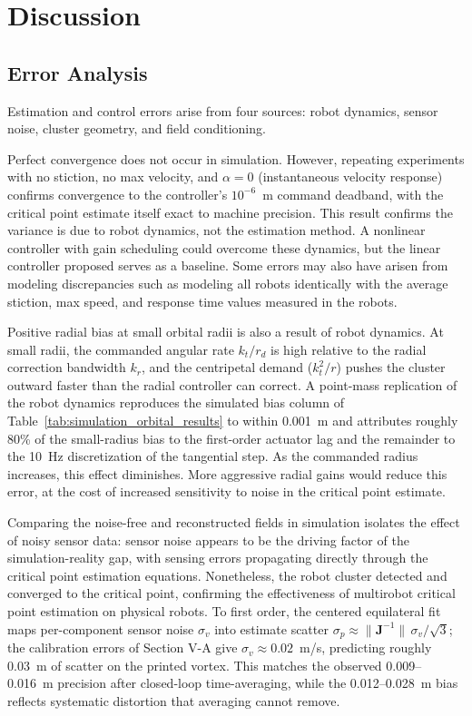 \documentclass[lettersize,journal]{IEEEtran}
\begin{document}
\section{Discussion}

\subsection{Error Analysis}

Estimation and control errors arise from four sources: robot dynamics, sensor noise, cluster geometry, and field conditioning.

Perfect convergence does not occur in simulation. However, repeating experiments with no stiction, no max velocity, and $\alpha = 0$ (instantaneous velocity response) confirms convergence to the controller's $10^{-6}$~m command deadband, with the critical point estimate itself exact to machine precision. This result confirms the variance is due to robot dynamics, not the estimation method. A nonlinear controller with gain scheduling could overcome these dynamics, but the linear controller proposed serves as a baseline. Some errors may also have arisen from modeling discrepancies such as modeling all robots identically with the average stiction, max speed, and response time values measured in the robots.

Positive radial bias at small orbital radii is also a result of robot dynamics. At small radii, the commanded angular rate $k_t / r_d$ is high relative to the radial correction bandwidth $k_r$, and the centripetal demand ($k_t^2 / r$) pushes the cluster outward faster than the radial controller can correct. A point-mass replication of the robot dynamics reproduces the simulated bias column of Table~\ref{tab:simulation_orbital_results} to within 0.001~m and attributes roughly 80\% of the small-radius bias to the first-order actuator lag and the remainder to the 10~Hz discretization of the tangential step. As the commanded radius increases, this effect diminishes. More aggressive radial gains would reduce this error, at the cost of increased sensitivity to noise in the critical point estimate.

Comparing the noise-free and reconstructed fields in simulation isolates the effect of noisy sensor data: sensor noise appears to be the driving factor of the simulation-reality gap, with sensing errors propagating directly through the critical point estimation equations. Nonetheless, the robot cluster detected and converged to the critical point, confirming the effectiveness of multirobot critical point estimation on physical robots. To first order, the centered equilateral fit maps per-component sensor noise $\sigma_v$ into estimate scatter $\sigma_p \approx \|\mathbf{J}^{-1}\|\,\sigma_v/\sqrt{3}$; the calibration errors of Section V-A give $\sigma_v \approx 0.02$~m/s, predicting roughly 0.03~m of scatter on the printed vortex. This matches the observed 0.009--0.016~m precision after closed-loop time-averaging, while the 0.012--0.028~m bias reflects systematic distortion that averaging cannot remove.
\end{document}
